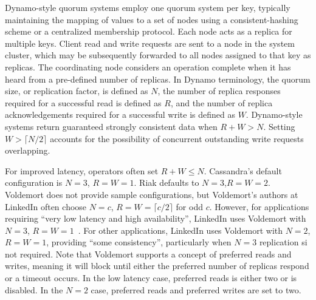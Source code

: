 \documentclass{vldb}
\begin{document}
Dynamo-style quorum systems employ one quorum system per key,
typically maintaining the mapping of values to a set of nodes using a
consistent-hashing scheme or a centralized membership protocol. Each
node acts as a replica for multiple keys.  Client read and write
requests are sent to a node in the system cluster, which may be
subsequently forwarded to all nodes assigned to that key as replicas.
The coordinating node considers an operation complete when it has
heard from a pre-defined number of replicas.  In Dynamo terminology,
the quorum size, or replication factor, is defined as $N$, the number
of replica responses required for a successful read is defined as $R$,
and the number of replica acknowledgements required for a successful
write is defined as $W$. Dynamo-style systems return guaranteed
strongly consistent data when $R+W > N$.  Setting $W>\lceil N/2 \rceil$ accounts for
the possibility of concurrent outstanding write requests overlapping.

For improved latency, operators often set $R+W \leq N$.  Cassandra's
default configuration is $N$$=$$3$, $R$$=$$W$$=$$1$.  Riak defaults to
$N$$=$$3$,$R$$=$$W$$=$$2$.  Voldemort does not provide sample
configurations, but Voldemort's authors at LinkedIn often choose
$N$$=$$c$, $R$$=$$W$$=$$ \lceil c/2 \rceil$ for odd $c$.  However, for
applications requiring ``very low latency and high availability'',
LinkedIn uses Voldemort with $N$$=$$3$,
$R$$=$$W$$=$$1$~\cite{feinbergpc}.  For other applications, LinkedIn
uses Voldemort with $N$$=$$2$, $R$$=$$W$$=$$1$, providing ``some
consistency'', particularly when $N$$=$$3$ replication si not
required.  Note that Voldemort supports a concept of preferred reads
and writes, meaning it will block until either the preferred number of
replicas respond or a timeout occurs.  In the low latency case,
preferred reads is either two or is disabled.  In the $N$$=$$2$ case,
preferred reads and preferred writes are set to two.
\end{document}
